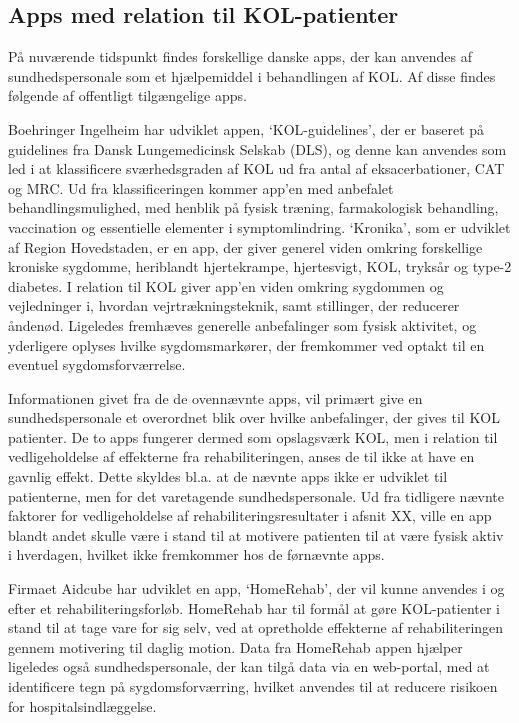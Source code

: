 \subsection{Apps med relation til KOL-patienter}
På nuværende tidspunkt findes forskellige danske apps, der kan anvendes af sundhedspersonale som et hjælpemiddel i behandlingen af KOL. Af disse findes følgende af offentligt tilgængelige apps. 

Boehringer Ingelheim har udviklet appen, ‘KOL-guidelines’, der er baseret på guidelines fra Dansk Lungemedicinsk Selskab (DLS), og denne kan anvendes som led i at klassificere sværhedsgraden af KOL ud fra antal af eksacerbationer, CAT og MRC. Ud fra klassificeringen kommer app’en med anbefalet behandlingsmulighed, med henblik på fysisk træning, farmakologisk behandling, vaccination og essentielle elementer i symptomlindring.    
‘Kronika’, som er udviklet af Region Hovedstaden, er en app, der giver generel viden omkring forskellige kroniske sygdomme, heriblandt hjertekrampe, hjertesvigt, KOL, tryksår og type-2 diabetes. I relation til KOL giver app’en viden omkring sygdommen og vejledninger i, hvordan vejrtrækningsteknik, samt stillinger, der reducerer åndenød. Ligeledes fremhæves generelle anbefalinger som fysisk aktivitet, og yderligere oplyses hvilke sygdomsmarkører, der fremkommer ved optakt til en eventuel sygdomsforværrelse.    

Informationen givet fra de de ovennævnte apps, vil primært give en sundhedspersonale et overordnet blik over hvilke anbefalinger, der gives til KOL patienter. De to apps fungerer dermed som opslagsværk KOL, men i relation til vedligeholdelse af effekterne fra rehabiliteringen, anses de til ikke at have en gavnlig effekt. 
Dette skyldes bl.a. at de nævnte apps ikke er udviklet til patienterne, men for det varetagende sundhedspersonale. Ud fra tidligere nævnte faktorer for vedligeholdelse af rehabiliteringsresultater i afsnit XX, ville en app blandt andet skulle være i stand til at motivere patienten til at være fysisk aktiv i hverdagen, hvilket ikke fremkommer hos de førnævnte apps. 

Firmaet Aidcube har udviklet en app, ‘HomeRehab’, der vil kunne anvendes i og efter et rehabiliteringsforløb. HomeRehab har til formål at gøre KOL-patienter i stand til at tage vare for sig selv, ved at opretholde effekterne af rehabiliteringen gennem motivering til daglig motion. Data fra HomeRehab appen hjælper ligeledes også sundhedspersonale, der kan tilgå data via en web-portal, med at identificere tegn på sygdomsforværring, hvilket anvendes til at reducere risikoen for hospitalsindlæggelse. \cite{HealthcareDenmark2017}

